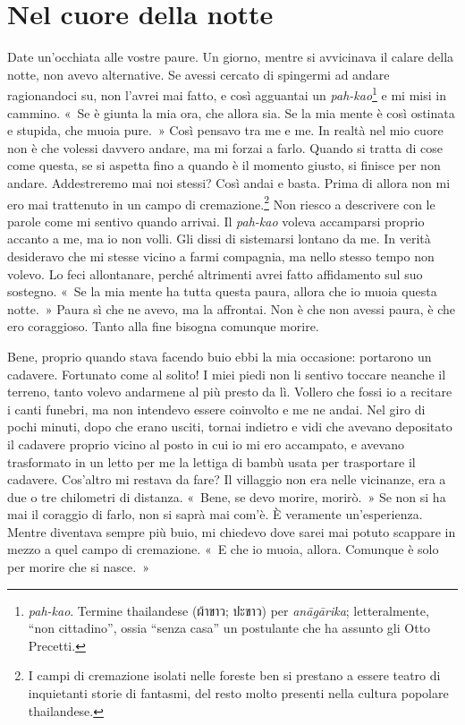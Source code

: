 \chapter{Nel cuore della notte}

Date un'occhiata alle vostre paure. Un giorno, mentre si avvicinava il
calare della notte, non avevo alternative. Se avessi cercato di
spingermi ad andare ragionandoci su, non l'avrei mai fatto, e così
agguantai un \emph{pah-kao}\footnote{\emph{pah-kao}. Termine thailandese
  (ผ้าขาว; ปะขาว) per \emph{anāgārika}; letteralmente, ``non
  cittadino'', ossia ``senza casa'' un postulante che ha assunto gli
  Otto Precetti.} e mi misi in cammino. «~Se è giunta la mia ora, che
allora sia. Se la mia mente è così ostinata e stupida, che muoia pure.~»
Così pensavo tra me e me. In realtà nel mio cuore non è che volessi
davvero andare, ma mi forzai a farlo. Quando si tratta di cose come
questa, se si aspetta fino a quando è il momento giusto, si finisce per
non andare. Addestreremo mai noi stessi? Così andai e basta. Prima di
allora non mi ero mai trattenuto in un campo di cremazione.\footnote{I
  campi di cremazione isolati nelle foreste ben si prestano a essere
  teatro di inquietanti storie di fantasmi, del resto molto presenti
  nella cultura popolare thailandese.} Non riesco a descrivere con le
parole come mi sentivo quando arrivai. Il \emph{pah-kao} voleva
accamparsi proprio accanto a me, ma io non volli. Gli dissi di
sistemarsi lontano da me. In verità desideravo che mi stesse vicino a
farmi compagnia, ma nello stesso tempo non volevo. Lo feci allontanare,
perché altrimenti avrei fatto affidamento sul suo sostegno. «~Se la mia
mente ha tutta questa paura, allora che io muoia questa notte.~» Paura
sì che ne avevo, ma la affrontai. Non è che non avessi paura, è che ero
coraggioso. Tanto alla fine bisogna comunque morire.

Bene, proprio quando stava facendo buio ebbi la mia occasione: portarono
un cadavere. Fortunato come al solito! I miei piedi non li sentivo
toccare neanche il terreno, tanto volevo andarmene al più presto da lì.
Vollero che fossi io a recitare i canti funebri, ma non intendevo essere
coinvolto e me ne andai. Nel giro di pochi minuti, dopo che erano
usciti, tornai indietro e vidi che avevano depositato il cadavere
proprio vicino al posto in cui io mi ero accampato, e avevano
trasformato in un letto per me la lettiga di bambù usata per trasportare
il cadavere. Cos'altro mi restava da fare? Il villaggio non era nelle
vicinanze, era a due o tre chilometri di distanza. «~Bene, se devo
morire, morirò.~» Se non si ha mai il coraggio di farlo, non si saprà
mai com'è. È veramente un'esperienza. Mentre diventava sempre più buio,
mi chiedevo dove sarei mai potuto scappare in mezzo a quel campo di
cremazione. «~E che io muoia, allora. Comunque è solo per morire che si
nasce.~»

